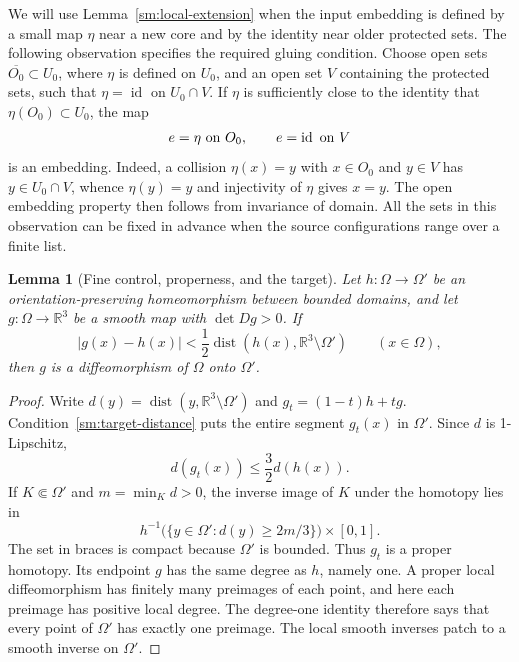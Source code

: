 \documentclass[11pt]{article}
\numberwithin{equation}{section}
\newtheorem{lemma}[theorem]{Lemma}
\theoremstyle{definition}
\theoremstyle{remark}
\begin{document}
We will use Lemma~\ref{sm:local-extension} when the input embedding is
defined by a small map $\eta$ near a new core and by the identity near
older protected sets.  The following observation specifies the required
gluing condition.  Choose open sets
$\overline{O_0}\subset U_0$, where $\eta$ is defined on $U_0$, and
an open set $V$ containing the protected sets, such that
$\eta=\operatorname{id}$ on $U_0\cap V$.  If $\eta$ is sufficiently close to
the identity that $\eta(O_0)\subset U_0$, the map
\begin{equation}
 \label{sm:patched-embedding}
 e=\eta\ \hbox{on }O_0,\qquad e=\operatorname{id}\ \hbox{on }V
\end{equation}
is an embedding.  Indeed, a collision $\eta(x)=y$ with
$x\in O_0$ and $y\in V$ has $y\in U_0\cap V$, whence
$\eta(y)=y$ and injectivity of $\eta$ gives $x=y$.  The open
embedding property then follows from invariance of domain.  All the
sets in this observation can be fixed in advance when the source
configurations range over a finite list.

\begin{lemma}[Fine control, properness, and the target]
\label{sm:proper-degree}
Let $h:\Omega\to\Omega'$ be an orientation-preserving homeomorphism
between bounded domains, and let $g:\Omega\to\mathbb R^3$ be a smooth
map with $\det Dg>0$.  If
\begin{equation}
 \label{sm:target-distance}
 |g(x)-h(x)|<\frac12\operatorname{dist}(h(x),\mathbb R^3\setminus\Omega')
 \qquad(x\in\Omega),
\end{equation}
then $g$ is a diffeomorphism of $\Omega$ onto $\Omega'$.
\end{lemma}

\begin{proof}
Write $d(y)=\operatorname{dist}(y,\mathbb R^3\setminus\Omega')$ and
$g_t=(1-t)h+tg$.  Condition~\eqref{sm:target-distance} puts the entire
segment $g_t(x)$ in $\Omega'$.  Since $d$ is 1-Lipschitz,
\[
 d(g_t(x))\le\frac32d(h(x)).
\]
If $K\Subset\Omega'$ and $m=\min_Kd>0$, the inverse image of $K$
under the homotopy lies in
\[
 h^{-1}\bigl(\{y\in\Omega':d(y)\ge2m/3\}\bigr)\times[0,1].
\]
The set in braces is compact because $\Omega'$ is bounded.
Thus $g_t$ is a proper homotopy.  Its endpoint $g$ has the same
degree as $h$, namely one.  A proper local diffeomorphism has
finitely many preimages of each point, and here each preimage has
positive local degree.  The degree-one identity therefore says that
every point of $\Omega'$ has exactly one preimage.  The local smooth
inverses patch to a smooth inverse on $\Omega'$.
\end{proof}
\end{document}
